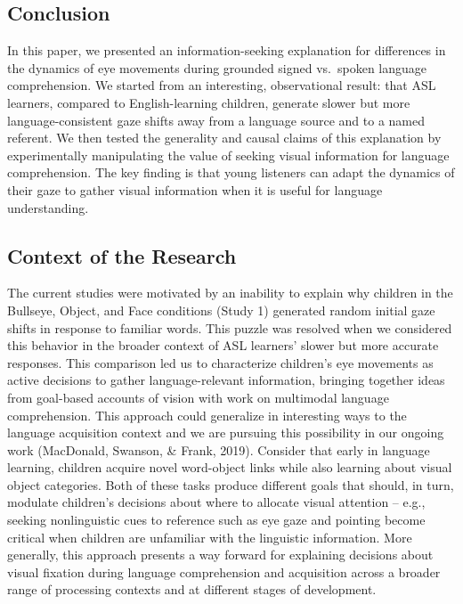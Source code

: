 \documentclass[,man,floatsintext]{apa6}
\begin{document}
\hypertarget{conclusion}{%
\subsection{Conclusion}\label{conclusion}}

In this paper, we presented an information-seeking explanation for differences in the dynamics of eye movements during grounded signed vs.~spoken language comprehension. We started from an interesting, observational result: that ASL learners, compared to English-learning children, generate slower but more language-consistent gaze shifts away from a language source and to a named referent. We then tested the generality and causal claims of this explanation by experimentally manipulating the value of seeking visual information for language comprehension. The key finding is that young listeners can adapt the dynamics of their gaze to gather visual information when it is useful for language understanding.

\hypertarget{context-of-the-research}{%
\subsection{Context of the Research}\label{context-of-the-research}}

The current studies were motivated by an inability to explain why children in the Bullseye, Object, and Face conditions (Study 1) generated random initial gaze shifts in response to familiar words. This puzzle was resolved when we considered this behavior in the broader context of ASL learners' slower but more accurate responses. This comparison led us to characterize children's eye movements as active decisions to gather language-relevant information, bringing together ideas from goal-based accounts of vision with work on multimodal language comprehension. This approach could generalize in interesting ways to the language acquisition context and we are pursuing this possibility in our ongoing work (MacDonald, Swanson, \& Frank, 2019). Consider that early in language learning, children acquire novel word-object links while also learning about visual object categories. Both of these tasks produce different goals that should, in turn, modulate children's decisions about where to allocate visual attention -- e.g., seeking nonlinguistic cues to reference such as eye gaze and pointing become critical when children are unfamiliar with the linguistic information. More generally, this approach presents a way forward for explaining decisions about visual fixation during language comprehension and acquisition across a broader range of processing contexts and at different stages of development.
\end{document}
